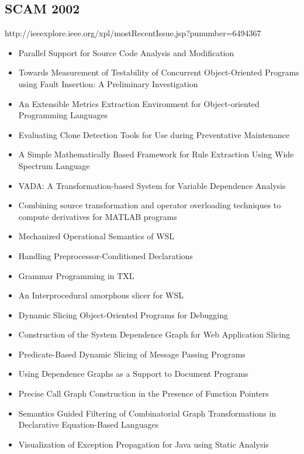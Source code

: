 \subsection{SCAM 2002}

http://ieeexplore.ieee.org/xpl/mostRecentIssue.jsp?punumber=6494367

{\small
\begin{itemize}[itemsep=-1ex]
  \item Parallel Support for Source Code Analysis and Modification
  \item Towards Measurement of Testability of Concurrent Object-Oriented Programs using Fault Insertion: A Preliminary Investigation
  \item An Extensible Metrics Extraction Environment for Object-oriented Programming Languages
  \item Evaluating Clone Detection Tools for Use during Preventative Maintenance
  \item A Simple Mathematically Based Framework for Rule Extraction Using Wide Spectrum Language
  \item VADA: A Transformation-based System for Variable Dependence Analysis
  \item Combining source transformation and operator overloading techniques to compute derivatives for MATLAB programs
  \item Mechanized Operational Semantics of WSL
  \item Handling Preprocessor-Conditioned Declarations
  \item Grammar Programming in TXL
  \item An Interprocedural amorphous slicer for WSL
  \item Dynamic Slicing Object-Oriented Programs for Debugging
  \item Construction of the System Dependence Graph for Web Application Slicing
  \item Predicate-Based Dynamic Slicing of Message Passing Programs
  \item Using Dependence Graphs as a Support to Document Programs
  \item Precise Call Graph Construction in the Presence of Function Pointers
  \item Semantics Guided Filtering of Combinatorial Graph Transformations in Declarative Equation-Based Languages
  \item Visualization of Exception Propagation for Java using Static Analysis
\end{itemize}
}


